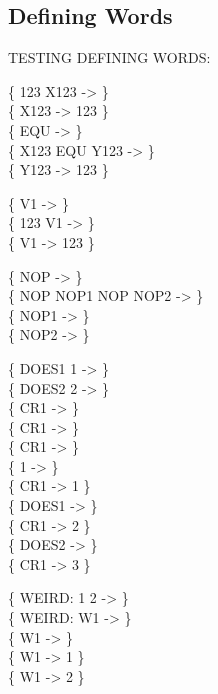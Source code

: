 \subsection{Defining Words}

\begin{tt}
TESTING DEFINING WORDS: \word{:} \word{;}     

\{ 123  X123 -> \} \\
\{ X123 -> 123 \} \\
\{ \word{:} EQU  \word{;} -> \} \\
\{ X123 EQU Y123 -> \} \\
\{ Y123 -> 123 \}

\{  V1 ->     \} \\
\{    123 V1 \word{!} ->     \} \\
\{        V1  -> 123 \}

\{ \word{:} NOP \word{:}  \word{;} \word{;} -> \} \\
\{ NOP NOP1		NOP NOP2 -> \} \\
\{ 					NOP1 -> \} \\
\{ 					NOP2 -> \}

\{ \word{:} DOES1   1 \word{+} \word{;} -> \} \\
\{ \word{:} DOES2   2 \word{+} \word{;} -> \} \\
\{  CR1 -> \} \\
\{ CR1 ->   \} \\
\{  CR1  ->  \} \\
\{ 1 \word{,} -> \} \\
\{ CR1  -> 1 \} \\
\{ DOES1 -> \} \\
\{ CR1 -> 2 \} \\
\{ DOES2 -> \} \\
\{ CR1 -> 3 \}

\{ \word{:} WEIRD:   1 \word{+}  2 \word{+} \word{;} -> \} \\
\{ WEIRD: W1 -> \} \\
\{  W1  ->  \} \\
\{ W1 ->  1 \word{+} \} \\
\{ W1 ->  2 \word{+} \}
\end{tt}

